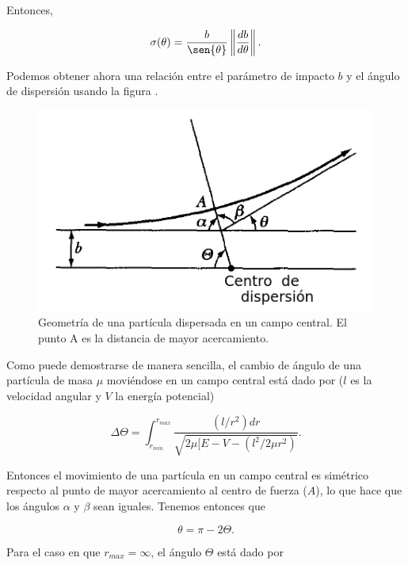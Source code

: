 \documentclass[a4paper,10pt]{article}
\numberwithin{equation}{section}
\begin{document}
Entonces,

\begin{equation}
 \sigma(\theta) = \frac{b}{\sen{\theta}}\left\| \frac{db}{d\theta} \right\|.
 \label{eq:disper6}
\end{equation}

Podemos obtener ahora una relación entre el parámetro de impacto $b$ y el 
ángulo de dispersión usando la figura .

\begin{figure}[H]
 \center
 \includegraphics[scale=0.5]{problema3fig3}
 \caption{Geometría de una partícula dispersada en un campo central. El punto
 A es la distancia de mayor acercamiento.}
 \label{fig:problema3fig3}
\end{figure}

Como puede demostrarse de manera sencilla, el cambio de ángulo 
de una partícula de masa $\mu$ moviéndose en un campo central está
dado por ($l$ es la velocidad angular y $V$ la energía potencial)

\begin{equation}
 \Delta \Theta = \int_{r_{min}}^{r_{max}} \frac{(l/r^2)dr}{\sqrt{2\mu[
 E - V - (l^2/2\mu r^2)}}.
 \label{eq:disper7}
\end{equation}

Entonces el movimiento de una partícula en un campo central es simétrico
respecto al punto de mayor acercamiento al centro de fuerza ($A$), lo que
hace que los ángulos $\alpha$ y $\beta$ sean iguales. Tenemos entonces que 

\begin{equation}
 \theta = \pi - 2\Theta.
 \label{eq:disper8}
\end{equation}

Para el caso en que $r_{max} = \infty$, el ángulo $\Theta$ está dado por
\end{document}
